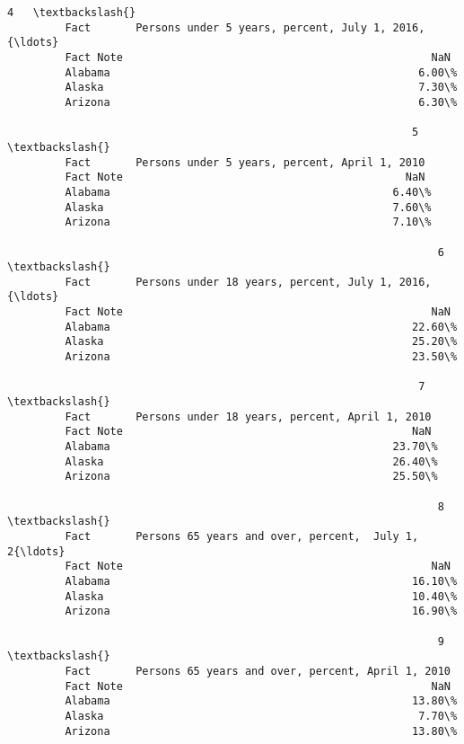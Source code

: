\documentclass[11pt]{article}
\begin{document}
\begin{Verbatim}[commandchars=\\\{\}]
                                                                   4   \textbackslash{}
         Fact       Persons under 5 years, percent, July 1, 2016, {\ldots}   
         Fact Note                                                NaN   
         Alabama                                                6.00\%   
         Alaska                                                 7.30\%   
         Arizona                                                6.30\%   
         
                                                               5   \textbackslash{}
         Fact       Persons under 5 years, percent, April 1, 2010   
         Fact Note                                            NaN   
         Alabama                                            6.40\%   
         Alaska                                             7.60\%   
         Arizona                                            7.10\%   
         
                                                                   6   \textbackslash{}
         Fact       Persons under 18 years, percent, July 1, 2016,{\ldots}   
         Fact Note                                                NaN   
         Alabama                                               22.60\%   
         Alaska                                                25.20\%   
         Arizona                                               23.50\%   
         
                                                                7   \textbackslash{}
         Fact       Persons under 18 years, percent, April 1, 2010   
         Fact Note                                             NaN   
         Alabama                                            23.70\%   
         Alaska                                             26.40\%   
         Arizona                                            25.50\%   
         
                                                                   8   \textbackslash{}
         Fact       Persons 65 years and over, percent,  July 1, 2{\ldots}   
         Fact Note                                                NaN   
         Alabama                                               16.10\%   
         Alaska                                                10.40\%   
         Arizona                                               16.90\%   
         
                                                                   9   \textbackslash{}
         Fact       Persons 65 years and over, percent, April 1, 2010   
         Fact Note                                                NaN   
         Alabama                                               13.80\%   
         Alaska                                                 7.70\%   
         Arizona                                               13.80\%   
         

\end{Verbatim}
\end{document}
